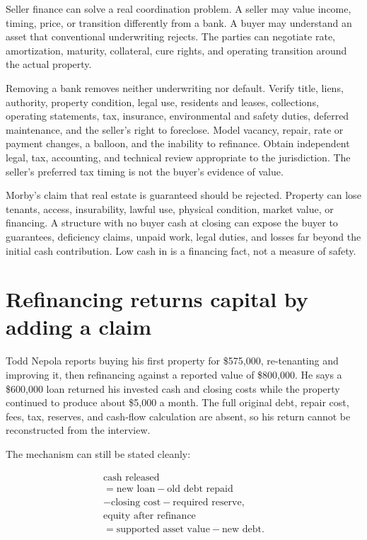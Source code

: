 Seller finance can solve a real coordination problem. A seller may value income,
timing, price, or transition differently from a bank. A buyer may understand an
asset that conventional underwriting rejects. The parties can negotiate rate,
amortization, maturity, collateral, cure rights, and operating transition around
the actual property.

Removing a bank removes neither underwriting nor default. Verify title, liens,
authority, property condition, legal use, residents and leases, collections,
operating statements, tax, insurance, environmental and safety duties, deferred
maintenance, and the seller's right to foreclose. Model vacancy, repair, rate or
payment changes, a balloon, and the inability to refinance. Obtain independent
legal, tax, accounting, and technical review appropriate to the jurisdiction.
The seller's preferred tax timing is not the buyer's evidence of value.

Morby's claim that real estate is guaranteed should be rejected. Property can
lose tenants, access, insurability, lawful use, physical condition, market
value, or financing. A structure with no buyer cash at closing can expose the
buyer to guarantees, deficiency claims, unpaid work, legal duties, and losses
far beyond the initial cash contribution. Low cash in is a financing fact, not
a measure of safety.

\section[Refinancing and debt]{Refinancing returns capital by adding a claim}

Todd Nepola reports buying his first property for \$575,000, re-tenanting and
improving it, then refinancing against a reported value of \$800,000. He says a
\$600,000 loan returned his invested cash and closing costs while the property
continued to produce about \$5,000 a month. The full original debt, repair cost,
fees, tax, reserves, and cash-flow calculation are absent, so his return cannot
be reconstructed from the interview.

The mechanism can still be stated cleanly:

\begin{equation}
\begin{gathered}
\text{cash released}\\
=\text{new loan}-\text{old debt repaid}\\
-\text{closing cost}-\text{required reserve},\\[0.5ex]
\text{equity after refinance}\\
=\text{supported asset value}-\text{new debt}.
\end{gathered}
\end{equation}

